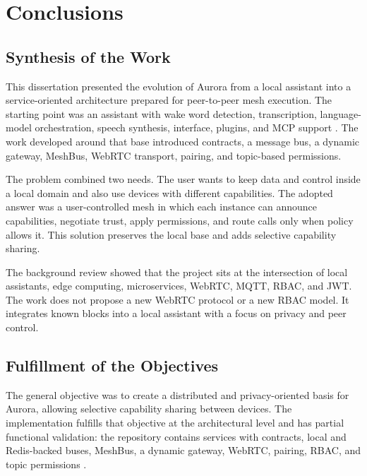 \chapter{Conclusions}
\label{chap:conclusions}

\section{Synthesis of the Work}
\label{sec:synthesis}

This dissertation presented the evolution of Aurora from a local assistant into a service-oriented architecture prepared for peer-to-peer mesh execution. The starting point was an assistant with wake word detection, transcription, language-model orchestration, speech synthesis, interface, plugins, and \gls{MCP} support \cite{aurora_repo}. The work developed around that base introduced contracts, a message bus, a dynamic gateway, MeshBus, WebRTC transport, pairing, and topic-based permissions.

The problem combined two needs. The user wants to keep data and control inside a local domain and also use devices with different capabilities. The adopted answer was a user-controlled mesh in which each instance can announce capabilities, negotiate trust, apply permissions, and route calls only when policy allows it. This solution preserves the local base and adds selective capability sharing.

The background review showed that the project sits at the intersection of local assistants, edge computing, microservices, WebRTC, MQTT, RBAC, and JWT. The work does not propose a new WebRTC protocol or a new RBAC model. It integrates known blocks into a local assistant with a focus on privacy and peer control.

\section{Fulfillment of the Objectives}
\label{sec:objective-fulfillment}

The general objective was to create a distributed and privacy-oriented basis for Aurora, allowing selective capability sharing between devices. The implementation fulfills that objective at the architectural level and has partial functional validation: the repository contains services with contracts, local and Redis-backed buses, MeshBus, a dynamic gateway, WebRTC, pairing, RBAC, and topic permissions \cite{aurora_architecture_doc,aurora_gateway_doc,aurora_handoff_doc}.

